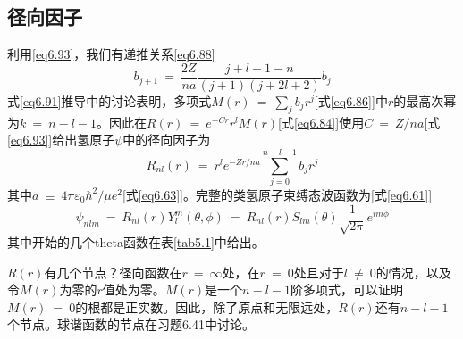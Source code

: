 \documentclass[12pt,a4paper,openany]{ctexbook}
\begin{document}
\subsection{径向因子}
\begin{flushleft}
    \setlength{\parindent}{2em}
利用\eqref{eq6.93}，我们有递推关系\eqref{eq6.88}
\begin{equation}
    b_{j+1}\ =\ \frac{2Z}{na}\frac{j+l+1-n}{(j+1)(j+2l+2)}b_j \label{eq6.99}
\end{equation}
式\eqref{eq6.91}推导中的讨论表明，多项式$M(r)\ =\ \sum_jb_jr^j$[式\eqref{eq6.86}]中$r$的最高次幂为$k\ =\ n-l-1$。因此在$R(r)\ =\ e^{-Cr}r^lM(r)$[式\eqref{eq6.84}]使用$C\ =\ Z/na$[式\eqref{eq6.93}]给出氢原子$\psi$中的径向因子为
\begin{equation}
    R_{nl}(r)\ =\ r^le^{-Zr/na}\sum_{j=0}^{n-l-1}b_jr^j \label{eq6.100}
\end{equation}
其中$a\ \equiv\ 4\pi\varepsilon_0\hbar^2/\mu e^2$[式\eqref{eq6.63}]。完整的类氢原子束缚态波函数为[式\eqref{eq6.61}]
\begin{equation}
    \psi_{nlm}\ =\ R_{nl}(r)Y_l^m(\theta,\phi)\ =\ R_{nl}(r)S_{lm}(\theta)\frac{1}{\sqrt{2\pi}}e^{im\phi} \label{eq6.101}
\end{equation}
其中开始的几个theta函数在表\ref{tab5.1}中给出。

$R(r)$有几个节点？径向函数在$r\ =\ \infty$处，在$r\ =\ 0$处且对于$l\ \neq\ 0$的情况，以及令$M(r)$为零的$r$值处为零。$M(r)$是一个$n-l-1$阶多项式，可以证明$M(r)\ =\ 0$的根都是正实数。因此，除了原点和无限远处，$R(r)$还有$n-l-1$个节点。球谐函数的节点在习题6.41中讨论。

\end{flushleft}
\end{document}
